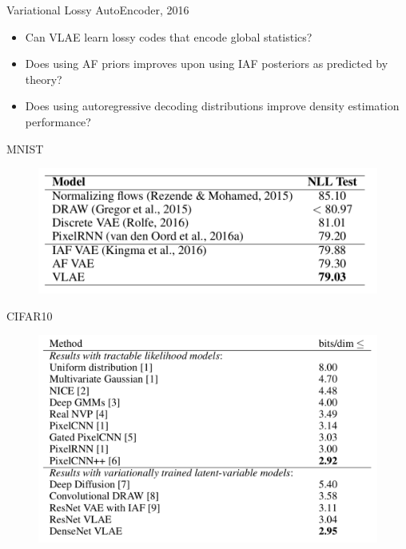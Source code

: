 \begin{frame}{Variational Lossy AutoEncoder, 2016}
\begin{itemize}
    \item Can VLAE learn lossy codes that encode global statistics?
    \item Does using AF priors improves upon using IAF posteriors as predicted by theory?
    \item Does using autoregressive decoding distributions improve density estimation performance?
\end{itemize}
	\begin{minipage}[t]{0.5\columnwidth}
	\vspace{1cm}
		MNIST
		\begin{figure}[h]
			\centering
			\includegraphics[width=1.\linewidth]{figs/VLAE_1.png}
		\end{figure}
	\end{minipage}%
	\begin{minipage}[t]{0.5\columnwidth}
		CIFAR10
		\begin{figure}[h]
			\centering
			\includegraphics[width=1.\linewidth]{figs/VLAE_2.png}
		\end{figure}
	\end{minipage}

\end{frame}
